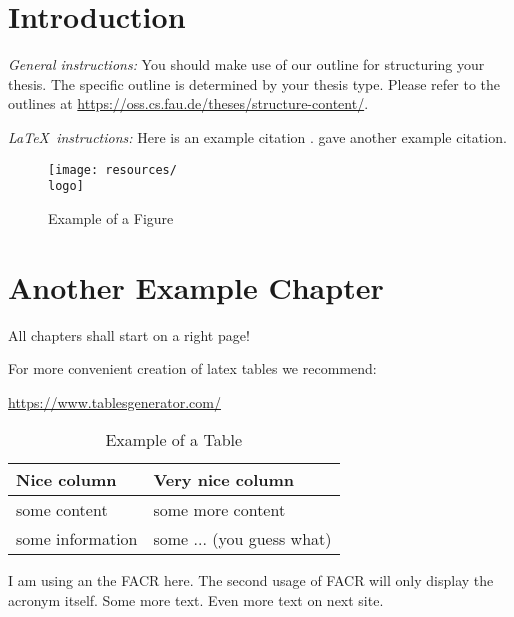 \chapter{Introduction}
\label{chapter:example}

{\textsl{General instructions:}} 
You should make use of our outline for structuring your
thesis. The specific outline is determined by your thesis type.
Please refer to the outlines at 
\url{https://oss.cs.fau.de/theses/structure-content/}.

{\textsl{\LaTeX\ instructions:}} Here is an example citation
\autocite{riehle:2011:controlling}.
\textcite{riehle:2007:economic} gave another example citation.

\begin{figure}[ht]
    \texttt{[image: resources/\\logo]}
    \caption{Example of a Figure} 
    \label{fig:example}
\end{figure}


\chapter{Another Example Chapter}
\label{cahpter:another-example}

All chapters shall start on a right page!

For more convenient creation of latex tables we recommend:

\url{https://www.tablesgenerator.com/}

\begin{table}[ht]
    \caption{Example of a Table}
    \label{tab:example}
    \begin{tabular}{|l|l|}
        \hline
        Nice column &  Very nice column\\
        \hline
        some content & some more content \\
        some information & some ... (you guess what) \\
        \hline
    \end{tabular}
\end{table}

I am using an the \ac{FACR} here. The second usage of \ac{FACR} will only display the acronym itself.
\newpage
Some more text.
\newpage
Even more text on next site.